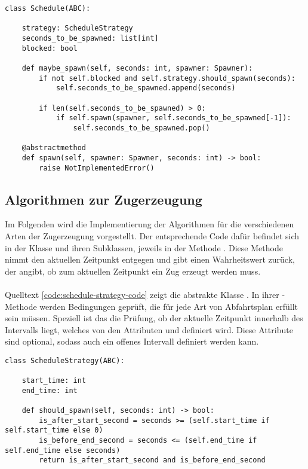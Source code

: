 \lstset{language=python}
\begin{lstlisting}[caption={Ausschnitt aus der abstrakten Klasse \code{Schedule}, welcher die \emph{Template-Method} \code{maybe\_spawn} und weitere relevante Attribute zeigt. \code{maybe\_spawn} prüft, ob zum Zeitpunkt \code{seconds} ein Zug erzeugt werden soll und erzeugt ihn dann ggf.}, label=code:template-method-code]
class Schedule(ABC):

    strategy: ScheduleStrategy
    seconds_to_be_spawned: list[int]
    blocked: bool

    def maybe_spawn(self, seconds: int, spawner: Spawner):
        if not self.blocked and self.strategy.should_spawn(seconds):
            self.seconds_to_be_spawned.append(seconds)

        if len(self.seconds_to_be_spawned) > 0:
            if self.spawn(spawner, self.seconds_to_be_spawned[-1]):
                self.seconds_to_be_spawned.pop()

    @abstractmethod
    def spawn(self, spawner: Spawner, seconds: int) -> bool:
    	raise NotImplementedError()
\end{lstlisting}

\subsection{Algorithmen zur Zugerzeugung}

Im Folgenden wird die Implementierung der Algorithmen für die verschiedenen Arten der Zugerzeugung vorgestellt. Der entsprechende Code dafür befindet sich in der Klasse  und ihren Subklassen, jeweils in der Methode . Diese Methode nimmt den aktuellen Zeitpunkt  entgegen und gibt einen Wahrheitswert zurück, der angibt, ob zum aktuellen Zeitpunkt ein Zug erzeugt werden muss.\\
\\
Quelltext \ref{code:schedule-strategy-code} zeigt die abstrakte Klasse . In ihrer -Methode werden Bedingungen geprüft, die für jede Art von Abfahrtsplan erfüllt sein müssen. Speziell ist das die Prüfung, ob der aktuelle Zeitpunkt innerhalb des Intervalls liegt, welches von den Attributen  und  definiert wird. Diese Attribute sind optional, sodass auch ein offenes Intervall definiert werden kann.

\lstset{language=python}
\begin{lstlisting}[caption={Ausschnitt aus der abstrakten Klasse \code{ScheduleStrategy}. Gezeigt wird die Methode \code{should\_spawn}, sowie die relevanten Attribute \code{start\_time} und \code{end\_time}.}, label=code:schedule-strategy-code]
class ScheduleStrategy(ABC):

    start_time: int
    end_time: int

    def should_spawn(self, seconds: int) -> bool:
        is_after_start_second = seconds >= (self.start_time if self.start_time else 0)
        is_before_end_second = seconds <= (self.end_time if self.end_time else seconds)
        return is_after_start_second and is_before_end_second
\end{lstlisting}

